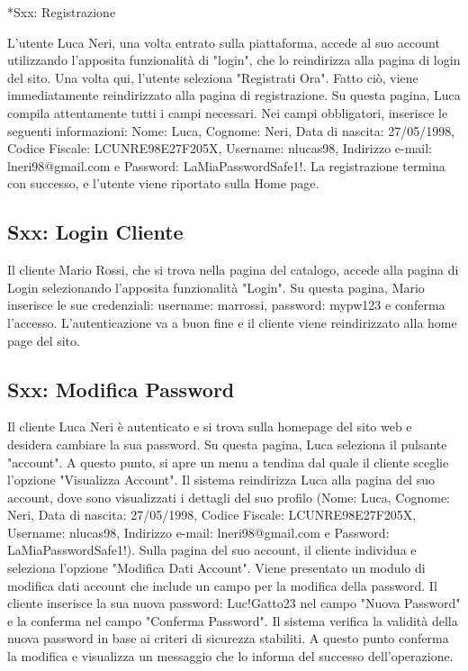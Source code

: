 \documentclass[12pt, a4paper, oneside]{book}
\begin{document}
    *{Sxx: Registrazione}
     L'utente Luca Neri, una volta entrato sulla piattaforma, accede al suo account utilizzando l'apposita funzionalità di "login", che lo
     reindirizza alla pagina di login del sito.
     Una volta qui, l'utente seleziona "Registrati Ora". Fatto ciò, viene immediatamente reindirizzato alla pagina di registrazione.
     Su questa pagina, Luca compila attentamente tutti i campi necessari. Nei campi obbligatori, inserisce le seguenti informazioni:
     Nome: Luca, Cognome: Neri, Data di nascita: 27/05/1998, Codice Fiscale: LCUNRE98E27F205X,
     Username: nlucas98, Indirizzo e-mail: lneri98@gmail.com e Password: LaMiaPasswordSafe1!.
     La registrazione termina con successo, e l’utente viene riportato sulla Home page.

    \subsection*{Sxx: Login Cliente}
    Il cliente Mario Rossi, che si trova nella pagina del catalogo, accede alla pagina di Login selezionando l'apposita funzionalità "Login".
    Su questa pagina, Mario inserisce le sue credenziali: username: marrossi, password: mypw123 e conferma l'accesso.
    L'autenticazione va a buon fine e il cliente viene reindirizzato alla home page del sito.

    \subsection*{Sxx: Modifica Password}
    Il cliente Luca Neri è autenticato e si trova sulla homepage del sito web e desidera cambiare la sua password.
    Su questa pagina, Luca seleziona il pulsante "account".
    A questo punto, si apre un menu a tendina dal quale il cliente sceglie l'opzione "Visualizza Account".
    Il sistema reindirizza Luca alla pagina del suo account, dove sono visualizzati i dettagli del suo profilo
    (Nome: Luca, Cognome: Neri, Data di nascita: 27/05/1998, Codice Fiscale: LCUNRE98E27F205X, Username: nlucas98,
     Indirizzo e-mail: lneri98@gmail.com e Password: LaMiaPasswordSafe1!).
    Sulla pagina del suo account, il cliente individua e seleziona l'opzione "Modifica Dati Account".
    Viene presentato un modulo di modifica dati account che include un campo per la modifica della password.
    Il cliente inserisce la sua nuova password: Luc!Gatto23 nel campo "Nuova Password" e la conferma nel campo "Conferma Password".
    Il sistema verifica la validità della nuova password in base ai criteri di sicurezza stabiliti.
    A questo punto conferma la modifica e visualizza un messaggio che lo informa del successo dell'operazione.
\end{document}

